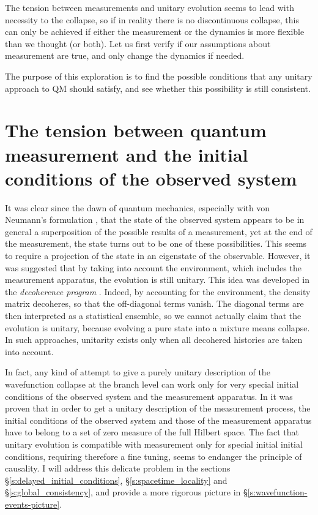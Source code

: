 \documentclass[11pt]{amsart}
\theoremstyle{definition}
\theoremstyle{plain}
\begin{document}
The tension between measurements and unitary evolution seems to lead with necessity to the collapse, so if in reality there is no discontinuous collapse, this can only be achieved if either the measurement or the dynamics is more flexible than we thought (or both). Let us first verify if our assumptions about measurement are true, and only change the dynamics if needed.

The purpose of this exploration is to find the possible conditions that any unitary approach to QM should satisfy, and see whether this possibility is still consistent.


\section{The tension between quantum measurement and the initial conditions of the observed system}
\label{s:qm_init_cond}

It was clear since the dawn of quantum mechanics, especially with von Neumann's formulation \cite{vonNeumann1955foundations}, that the state of the observed system appears to be in general a superposition of the possible results of a measurement, yet at the end of the measurement, the state turns out to be one of these possibilities. This seems to require a projection of the state in an eigenstate of the observable. However, it was suggested that by taking into account the environment, which includes the measurement apparatus, the evolution is still unitary. This idea was developed in the \textit{decoherence program} \cite{Zeh96,Zur98,Zur03a}. Indeed, by accounting for the environment, the density matrix decoheres, so that the off-diagonal terms vanish. The diagonal terms are then interpreted as a statistical ensemble, so we cannot actually claim that the evolution is unitary, because evolving a pure state into a mixture means collapse. In such approaches, unitarity exists only when all decohered histories are taken into account.

In fact, any kind of attempt to give a purely unitary description of the wavefunction collapse at the branch level can work only for very special initial conditions of the observed system and the measurement apparatus. In \cite{Sto12QMb} it was proven that in order to get a unitary description of the measurement process, the initial conditions of the observed system and those of the measurement apparatus have to belong to a set of zero measure of the full Hilbert space. The fact that unitary evolution is compatible with measurement only for special initial initial conditions, requiring therefore a fine tuning, seems to endanger the principle of causality. I will address this delicate problem in  the sections \S\ref{s:delayed_initial_conditions}, \S\ref{s:spacetime_locality} and \S\ref{s:global_consistency}, and provide a more rigorous picture in \S\ref{s:wavefunction-events-picture}.
\end{document}
